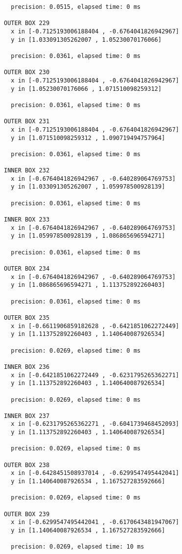 \begin{verbatim}
  precision: 0.0515, elapsed time: 0 ms

OUTER BOX 229
  x in [-0.7125193006188404 , -0.6764041826942967]
  y in [1.033091305262007 , 1.05230070176066]

  precision: 0.0361, elapsed time: 0 ms

OUTER BOX 230
  x in [-0.7125193006188404 , -0.6764041826942967]
  y in [1.05230070176066 , 1.071510098259312]

  precision: 0.0361, elapsed time: 0 ms

OUTER BOX 231
  x in [-0.7125193006188404 , -0.6764041826942967]
  y in [1.071510098259312 , 1.090719494757964]

  precision: 0.0361, elapsed time: 0 ms

INNER BOX 232
  x in [-0.6764041826942967 , -0.640289064769753]
  y in [1.033091305262007 , 1.059978500928139]

  precision: 0.0361, elapsed time: 0 ms

INNER BOX 233
  x in [-0.6764041826942967 , -0.640289064769753]
  y in [1.059978500928139 , 1.086865696594271]

  precision: 0.0361, elapsed time: 0 ms

OUTER BOX 234
  x in [-0.6764041826942967 , -0.640289064769753]
  y in [1.086865696594271 , 1.113752892260403]

  precision: 0.0361, elapsed time: 0 ms

OUTER BOX 235
  x in [-0.6611906859182628 , -0.6421851062272449]
  y in [1.113752892260403 , 1.140640087926534]

  precision: 0.0269, elapsed time: 0 ms

INNER BOX 236
  x in [-0.6421851062272449 , -0.6231795265362271]
  y in [1.113752892260403 , 1.140640087926534]

  precision: 0.0269, elapsed time: 0 ms

INNER BOX 237
  x in [-0.6231795265362271 , -0.6041739468452093]
  y in [1.113752892260403 , 1.140640087926534]

  precision: 0.0269, elapsed time: 0 ms

OUTER BOX 238
  x in [-0.6428451508937014 , -0.6299547495442041]
  y in [1.140640087926534 , 1.167527283592666]

  precision: 0.0269, elapsed time: 0 ms

OUTER BOX 239
  x in [-0.6299547495442041 , -0.6170643481947067]
  y in [1.140640087926534 , 1.167527283592666]

  precision: 0.0269, elapsed time: 10 ms


\end{verbatim}
